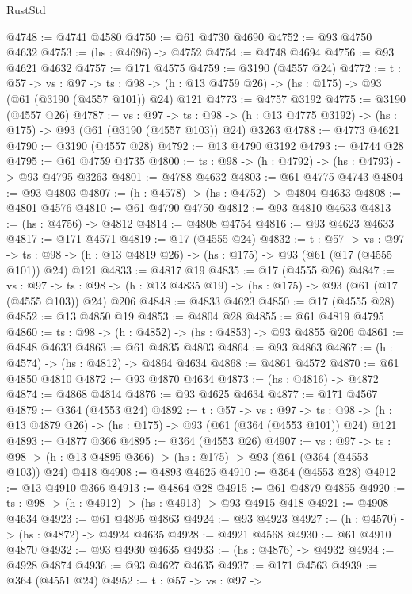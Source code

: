\begin{lexlean}{RustStd}
\begin{coremodule}
@4748 := @4741 @4580
@4750 := @61 @4730 @4690
@4752 := @93 @4750 @4632
@4753 := (hs : @4696) -> @4752
@4754 := @4748 @4694
@4756 := @93 @4621 @4632
@4757 := @171 @4575
@4759 := @3190 (@4557 @24)
@4772 := {t : @57} ->
  {vs : @97} ->
  {ts : @98} -> (h : @13 @4759 @26) -> (hs : @175) -> @93 (@61 (@3190 (@4557 @101)) @24) @121
@4773 := @4757 @3192
@4775 := @3190 (@4557 @26)
@4787 := {vs : @97} ->
  {ts : @98} -> (h : @13 @4775 @3192) -> (hs : @175) -> @93 (@61 (@3190 (@4557 @103)) @24) @3263
@4788 := @4773 @4621
@4790 := @3190 (@4557 @28)
@4792 := @13 @4790 @3192
@4793 := @4744 @28
@4795 := @61 @4759 @4735
@4800 := {ts : @98} -> (h : @4792) -> (hs : @4793) -> @93 @4795 @3263
@4801 := @4788 @4632
@4803 := @61 @4775 @4743
@4804 := @93 @4803
@4807 := (h : @4578) -> (hs : @4752) -> @4804 @4633
@4808 := @4801 @4576
@4810 := @61 @4790 @4750
@4812 := @93 @4810 @4633
@4813 := (hs : @4756) -> @4812
@4814 := @4808 @4754
@4816 := @93 @4623 @4633
@4817 := @171 @4571
@4819 := @17 (@4555 @24)
@4832 := {t : @57} ->
  {vs : @97} ->
  {ts : @98} -> (h : @13 @4819 @26) -> (hs : @175) -> @93 (@61 (@17 (@4555 @101)) @24) @121
@4833 := @4817 @19
@4835 := @17 (@4555 @26)
@4847 := {vs : @97} ->
  {ts : @98} -> (h : @13 @4835 @19) -> (hs : @175) -> @93 (@61 (@17 (@4555 @103)) @24) @206
@4848 := @4833 @4623
@4850 := @17 (@4555 @28)
@4852 := @13 @4850 @19
@4853 := @4804 @28
@4855 := @61 @4819 @4795
@4860 := {ts : @98} -> (h : @4852) -> (hs : @4853) -> @93 @4855 @206
@4861 := @4848 @4633
@4863 := @61 @4835 @4803
@4864 := @93 @4863
@4867 := (h : @4574) -> (hs : @4812) -> @4864 @4634
@4868 := @4861 @4572
@4870 := @61 @4850 @4810
@4872 := @93 @4870 @4634
@4873 := (hs : @4816) -> @4872
@4874 := @4868 @4814
@4876 := @93 @4625 @4634
@4877 := @171 @4567
@4879 := @364 (@4553 @24)
@4892 := {t : @57} ->
  {vs : @97} ->
  {ts : @98} -> (h : @13 @4879 @26) -> (hs : @175) -> @93 (@61 (@364 (@4553 @101)) @24) @121
@4893 := @4877 @366
@4895 := @364 (@4553 @26)
@4907 := {vs : @97} ->
  {ts : @98} -> (h : @13 @4895 @366) -> (hs : @175) -> @93 (@61 (@364 (@4553 @103)) @24) @418
@4908 := @4893 @4625
@4910 := @364 (@4553 @28)
@4912 := @13 @4910 @366
@4913 := @4864 @28
@4915 := @61 @4879 @4855
@4920 := {ts : @98} -> (h : @4912) -> (hs : @4913) -> @93 @4915 @418
@4921 := @4908 @4634
@4923 := @61 @4895 @4863
@4924 := @93 @4923
@4927 := (h : @4570) -> (hs : @4872) -> @4924 @4635
@4928 := @4921 @4568
@4930 := @61 @4910 @4870
@4932 := @93 @4930 @4635
@4933 := (hs : @4876) -> @4932
@4934 := @4928 @4874
@4936 := @93 @4627 @4635
@4937 := @171 @4563
@4939 := @364 (@4551 @24)
@4952 := {t : @57} ->
  {vs : @97} ->

\end{coremodule}
\end{lexlean}
